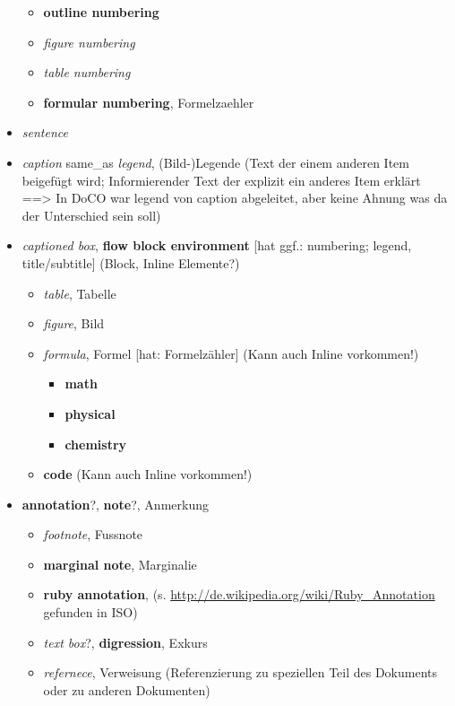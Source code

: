 \begin{itemize}
    \begin{itemize}
    \itemsep1pt\parskip0pt
    \item
      \textbf{outline numbering}
    \item
      \emph{figure numbering}
    \item
      \emph{table numbering}
    \item
      \textbf{formular numbering}, Formelzaehler
    \end{itemize}
  \item
    \emph{sentence}
  \item
    \emph{caption} same\_as \emph{legend}, (Bild-)Legende (Text der
    einem anderen Item beigefügt wird; Informierender Text der explizit
    ein anderes Item erklärt ==\textgreater{} In DoCO war legend von
    caption abgeleitet, aber keine Ahnung was da der Unterschied sein
    soll)
  \item
    \emph{captioned box}, \textbf{flow block environment} {[}hat ggf.:
    numbering; legend, title/subtitle{]} (Block, Inline Elemente?)

    \begin{itemize}
    \itemsep1pt\parskip0pt
    \item
      \emph{table}, Tabelle
    \item
      \emph{figure}, Bild
    \item
      \emph{formula}, Formel {[}hat: Formelzähler{]} (Kann auch Inline
      vorkommen!)

      \begin{itemize}
      \itemsep1pt\parskip0pt
      \item
        \textbf{math}
      \item
        \textbf{physical}
      \item
        \textbf{chemistry}
      \end{itemize}
    \item
      \textbf{code} (Kann auch Inline vorkommen!)
    \end{itemize}
  \item
    \textbf{annotation}?, \textbf{note}?, Anmerkung

    \begin{itemize}
    \itemsep1pt\parskip0pt
    \item
      \emph{footnote}, Fussnote
    \item
      \textbf{marginal note}, Marginalie
    \item
      \textbf{ruby annotation}, (s.
      \url{http://de.wikipedia.org/wiki/Ruby_Annotation} gefunden in
      ISO)
    \item
      \emph{text box}?, \textbf{digression}, Exkurs
    \item
      \emph{refernece}, Verweisung (Referenzierung zu speziellen Teil
      des Dokuments oder zu anderen Dokumenten)


\end{itemize}
\end{itemize}
